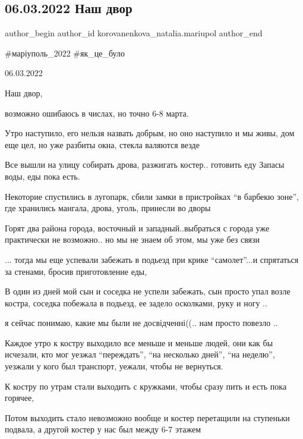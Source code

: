  
 
 
 
 

\subsection{06.03.2022 Наш двор}
\label{sec:06_03_2023.fb.korovanenkova_natalia.mariupol.1.06_03_nash_dvor_6_8_marta}

\ifcmt
 author_begin
   author_id korovanenkova_natalia.mariupol
 author_end
\fi

\#маріуполь\_2022 \#як\_це\_було

06.03.2022

Наш двор,

возможно ошибаюсь в числах, но точно 6-8 марта.

Утро наступило, его нельзя назвать добрым, но оно наступило и мы живы, дом
еще цел, но уже разбиты окна, стекла валяются везде

Все вышли на улицу собирать дрова, разжигать костер.. готовить еду Запасы воды,
еды пока есть.

Некоторие спустились в лугопарк, сбили замки  в пристройках \enquote{в барбекю
зоне}, где хранились мангала, дрова, уголь, принесли во дворы

Горят два района города, восточный и западный..выбраться с города уже
практически не возможно.. но мы не знаем об этом, мы   уже без  связи

... тогда мы  еще успевали забежать в подьезд при крике \enquote{самолет}...и
спрятаться за стенами, бросив приготовление еды, 

В один из дней мой сын и соседка не успели забежать, сын просто упал возле
костра, соседка побежала в подьезд, ее задело осколками, руку и ногу ..

я сейчас понимаю, какие мы были не досвідченні((.. нам просто повезло ..


Каждое утро к костру выходило все меньше и меньше людей, они как бы исчезали,
кто мог уезжал \enquote{переждать}, \enquote{на несколько дней}, \enquote{на
неделю}, уезжали у кого был транспорт, уежали, чтобы не вернуться.

К костру по утрам  стали выходить с кружками, чтобы сразу пить и есть пока
горячее,

Потом выходить стало невозможно вообще и костер перетащили на ступеньки
подвала, а другой костер у нас был между 6-7 этажем


